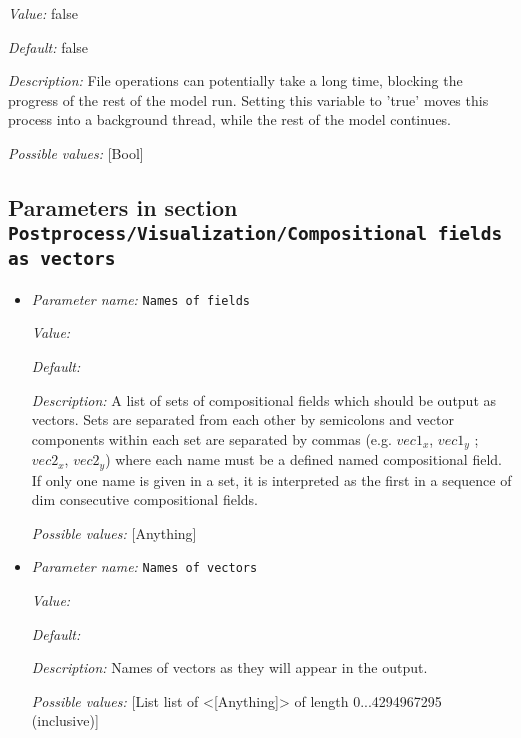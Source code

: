 \begin{itemize}
{\it Value:} false


{\it Default:} false


{\it Description:} File operations can potentially take a long time, blocking the progress of the rest of the model run. Setting this variable to 'true' moves this process into a background thread, while the rest of the model continues.


{\it Possible values:} [Bool]
\end{itemize}



\subsection{Parameters in section \tt Postprocess/Visualization/Compositional fields as vectors}
\label{parameters:Postprocess/Visualization/Compositional_20fields_20as_20vectors}

\begin{itemize}
\item {\it Parameter name:} {\tt Names of fields}
\label{parameters:Postprocess/Visualization/Compositional fields as vectors/Names of fields}


{\it Value:} 


{\it Default:} 


{\it Description:} A list of sets of compositional fields which should be output as vectors. Sets are separated from each other by semicolons and vector components within each set are separated by commas (e.g. $vec1_x$, $vec1_y$ ; $vec2_x$, $vec2_y$) where each name must be a defined named compositional field. If only one name is given in a set, it is interpreted as the first in a sequence of dim consecutive compositional fields.


{\it Possible values:} [Anything]
\item {\it Parameter name:} {\tt Names of vectors}
\label{parameters:Postprocess/Visualization/Compositional fields as vectors/Names of vectors}


{\it Value:} 


{\it Default:} 


{\it Description:} Names of vectors as they will appear in the output.


{\it Possible values:} [List list of <[Anything]> of length 0...4294967295 (inclusive)]
\end{itemize}

